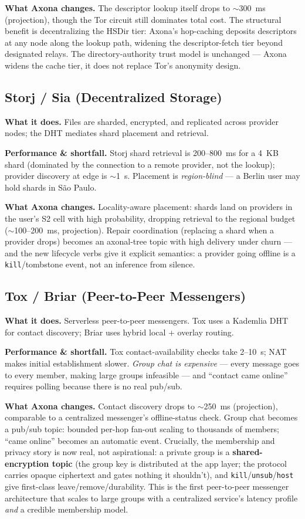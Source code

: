 \documentclass[nobib]{tufte-handout}
\begin{document}
\textbf{What Axona changes.} The descriptor lookup itself drops to
$\sim$300~ms (projection), though the Tor circuit still dominates total
cost. The structural benefit is decentralizing the HSDir tier: Axona's
hop-caching deposits descriptors at any node along the lookup path,
widening the descriptor-fetch tier beyond designated relays. The
directory-authority trust model is unchanged --- Axona widens the cache
tier, it does not replace Tor's anonymity design.

\subsection{Storj / Sia (Decentralized Storage)}

\textbf{What it does.} Files are sharded, encrypted, and replicated
across provider nodes; the DHT mediates shard placement and retrieval.

\textbf{Performance \& shortfall.} Storj shard retrieval is 200--800~ms
for a 4~KB shard (dominated by the connection to a remote provider, not
the lookup); provider discovery at edge is $\sim$1~s. Placement is
\emph{region-blind} --- a Berlin user may hold shards in S\~ao Paulo.

\textbf{What Axona changes.} Locality-aware placement: shards land on
providers in the user's S2 cell with high probability, dropping
retrieval to the regional budget ($\sim$100--200~ms, projection).
Repair coordination (replacing a shard when a provider drops) becomes
an axonal-tree topic with high delivery under churn --- and the new
lifecycle verbs give it explicit semantics: a provider going offline is
a \texttt{kill}/tombstone event, not an inference from silence.

\subsection{Tox / Briar (Peer-to-Peer Messengers)}

\textbf{What it does.} Serverless peer-to-peer messengers. Tox uses a
Kademlia DHT for contact discovery; Briar uses hybrid local + overlay
routing.

\textbf{Performance \& shortfall.} Tox contact-availability checks take
2--10~s; NAT makes initial establishment slower. \emph{Group chat is
expensive} --- every message goes to every member, making large groups
infeasible --- and ``contact came online'' requires polling because
there is no real pub/sub.

\textbf{What Axona changes.} Contact discovery drops to $\sim$250~ms
(projection), comparable to a centralized messenger's offline-status
check. Group chat becomes a pub/sub topic: bounded per-hop fan-out
scaling to thousands of members; ``came online'' becomes an automatic
event. Crucially, the membership and privacy story is now real, not
aspirational: a private group is a \textbf{shared-encryption topic}
(the group key is distributed at the app layer; the protocol carries
opaque ciphertext and gates nothing it shouldn't), and
\texttt{kill}/\texttt{unsub}/\texttt{host} give first-class
leave/remove/durability. This is the first peer-to-peer messenger
architecture that scales to large groups with a centralized service's
latency profile \emph{and} a credible membership model.
\end{document}
